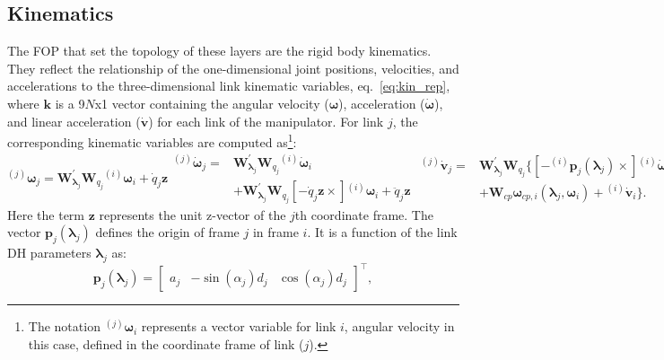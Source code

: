 \subsection{Kinematics}
The FOP that set the topology of these layers are the rigid body kinematics. They reflect the relationship of the one-dimensional joint positions, velocities, and accelerations to the three-dimensional link kinematic variables, eq.~\ref{eq:kin_rep}, where $\bm{k}$ is a 9$N$x1 vector containing the angular velocity ($\bm{\omega}$), acceleration ($\dot{\bm{\omega}}$), and linear acceleration ($\dot{\bm{v}}$) for each link of the manipulator. For link $j$, the corresponding kinematic variables are computed as\footnote{The notation $^{(j)}\bm{\omega}_{i}$ represents a vector variable for link $i$, angular velocity in this case, defined in  the coordinate frame of link ($j$).}:
\begin{subequations}
\begin{equation}
^{(j)}\bm{\omega}_{j}= \bm{W}^\prime_{\bm{\lambda}_{j}}\bm{W}_{q_{j}}{^{(i)}\bm{\omega}_{i}}+\dot{q}_{j}\bm{z}
\label{eq:ang_vel}
\end{equation}
\begin{align}
^{(j)}\dot{\bm{\omega}}_{j}= &\bm{W}^\prime_{\bm{\lambda}_{j}}\bm{W}_{q_{j}}{^{(i)}\dot{\bm{\omega}}_{i}}\nonumber \\&+\bm{W}^\prime_{\bm{\lambda}_{j}}\bm{W}_{q_{j}}[-\dot{q}_{j}\bm{z}\times]{^{(i)}\bm{\omega}_{i}}+\ddot{q}_{j}\bm{z}
\label{eq:ang_acc}
\end{align}
\begin{align}
^{(j)}\dot{\bm{v}}_{j}= &\bm{W}^\prime_{\bm{\lambda}_{j}}\bm{W}_{q_{j}}\{[-^{(i)}\bm{p}_j(\bm{\lambda}_j)\times]{^{(i)}\dot{\bm{\omega}}_{i}} \nonumber \\& +\bm{W}_{cp}\bm{\omega}_{cp,i}(\bm{\lambda}_j,\bm{\omega}_i)+{^{(i)}\dot{\bm{v}}_{i}}\}.
\label{eq:lin_acc}
\end{align}
\label{eq:kin_eq}
\end{subequations}
Here the term $\bm{z}$ represents the unit z-vector of the $j$th coordinate frame. The vector $\bm{p}_j(\bm{\lambda}_j)$ defines the origin of frame $j$ in frame $i$. It is a function of the link DH parameters $\bm{\lambda}_j$ as:
\begin{equation}
\bm{p}_j(\bm{\lambda}_j)= \begin{bmatrix} a_j & -\sin(\alpha_j)d_j & \cos(\alpha_j)d_j\end{bmatrix}^\intercal,
\label{eq:p_vec}
\end{equation}

